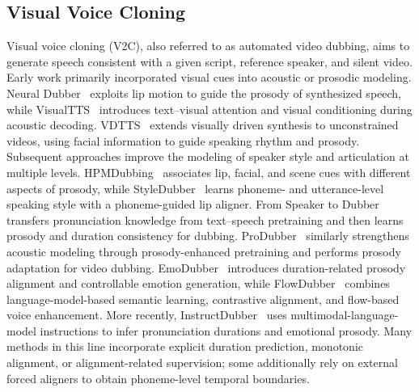 \subsection{Visual Voice Cloning}
\label{subsec:related_v2c}

Visual voice cloning (V2C), also referred to as automated video dubbing,
aims to generate speech consistent with a given script, reference
speaker, and silent video. Early work primarily incorporated visual
cues into acoustic or prosodic modeling. Neural
Dubber~\cite{hu2021neuraldub} exploits lip motion to guide the prosody
of synthesized speech, while VisualTTS~\cite{lu2022visualtts}
introduces text--visual attention and visual conditioning during
acoustic decoding. VDTTS~\cite{hassid2022vdtts} extends visually
driven synthesis to unconstrained videos, using facial information
to guide speaking rhythm and prosody. Subsequent approaches improve
the modeling of speaker style and articulation at multiple levels.
HPMDubbing~\cite{cong2023hpmdubbing} associates lip, facial, and scene cues
with different aspects of prosody, while
StyleDubber~\cite{cong2024styledubber} learns phoneme- and
utterance-level speaking style with a phoneme-guided lip aligner.
From Speaker to Dubber~\cite{zhang2024speaker2dubber} transfers
pronunciation knowledge from text--speech pretraining and then learns
prosody and duration consistency for dubbing. ProDubber~\cite{zhang2025produbber}
similarly strengthens acoustic modeling through prosody-enhanced
pretraining and performs prosody adaptation for video dubbing.
EmoDubber~\cite{cong2025emodubber} introduces duration-related
prosody alignment and controllable emotion generation, while
FlowDubber~\cite{cong2025flowdubber} combines language-model-based
semantic learning, contrastive alignment, and flow-based voice
enhancement. More recently, InstructDubber~\cite{zhang2026instructdubber}
uses multimodal-language-model instructions to infer pronunciation
durations and emotional prosody. Many methods in this line incorporate explicit duration
prediction, monotonic alignment, or alignment-related supervision;
some additionally rely on external forced aligners to obtain
phoneme-level temporal boundaries.

